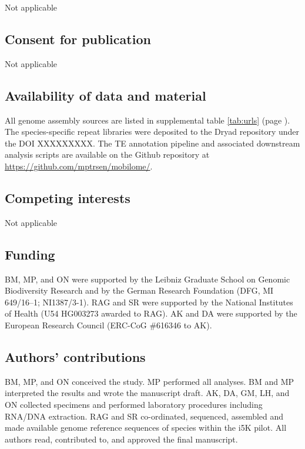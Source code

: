 Not applicable

\subsection{Consent for publication}\label{consent-for-publication}

Not applicable

\subsection{Availability of data and
material}\label{availability-of-data-and-material}

All genome assembly sources are listed in supplemental table
\ref{tab:urls} (page \pageref{tab:urls}). The species-specific repeat
libraries were deposited to the Dryad repository under the DOI
XXXXXXXXX. The TE annotation pipeline and associated downstream analysis
scripts are available on the Github repository at
\url{https://github.com/mptrsen/mobilome/}.

\subsection{Competing interests}\label{competing-interests}

Not applicable

\subsection{Funding}\label{funding}

BM, MP, and ON were supported by the Leibniz Graduate School on Genomic
Biodiversity Research and by the German Research Foundation (DFG, MI
649/16--1; NI1387/3-1). RAG and SR were supported by the National
Institutes of Health (U54 HG003273 awarded to RAG). AK and DA were
supported by the European Research Council (ERC-CoG \#616346 to AK).

\subsection{Authors' contributions}\label{authors-contributions}

BM, MP, and ON conceived the study. MP performed all analyses. BM and MP
interpreted the results and wrote the manuscript draft. AK, DA, GM, LH,
and ON collected specimens and performed laboratory procedures including
RNA/DNA extraction. RAG and SR co-ordinated, sequenced, assembled and
made available genome reference sequences of species within the i5K
pilot. All authors read, contributed to, and approved the final
manuscript.

